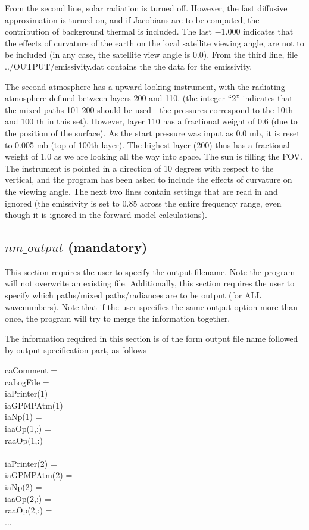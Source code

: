 \documentclass[12pt]{article}
\newcommand{\ttab}{\indent\indent}
\begin{document}
{From the second line, solar radiation is turned off.  However, the
fast diffusive approximation is turned on, and if Jacobians are to
be computed, the contribution of background thermal is included.
The last $-1.000$ indicates that the effects of curvature of the
earth on the local satellite viewing angle, are not to be included
(in any case, the satellite view angle is 0.0).  From the third
line, file {\sf ../OUTPUT/emissivity.dat} contains the the data for
the emissivity.

The second atmosphere has a upward looking instrument, with the
radiating atmosphere defined between layers 200 and 110.  (the
integer ``2'' indicates that the mixed paths 101-200 should be
used---the pressures correspond to the 10th and 100 th in this set).
However, layer 110 has a fractional weight of 0.6 (due to the
position of the surface).  As the start pressure was input as 0.0
mb, it is reset to 0.005 mb (top of 100th layer).  The highest layer
(200) thus has a fractional weight of 1.0 as we are looking all the
way into space.  The sun is filling the FOV.  The instrument is
pointed in a direction of 10 degrees with respect to the vertical,
and the program has been asked to include the effects of curvature
on the viewing angle.  The next two lines contain settings that are
read in and ignored (the emissivity is set to 0.85 across the entire
frequency range, even though it is ignored in the forward model
calculations).

\subsection{$nm\_output$ (mandatory)}

This section requires the user to specify the output filename.  Note
the program will not overwrite an existing file. Additionally, this section 
requires the user to specify which paths/mixed paths/radiances are to
be output (for ALL wavenumbers).  Note that if the user specifies the
same output option more than once, the program will try to merge the
information together.

The information required in this section is of the form
output file name followed by output specification part, as follows

\medskip
{\sf
\ttab caComment = \\
\ttab caLogFile = \\
\ttab iaPrinter(1)          =  \\
\ttab \indent iaGPMPAtm(1)  = \\
\ttab \indent iaNp(1)       = \\
\ttab \indent iaaOp(1,:)    = \\
\ttab \indent raaOp(1,:)    = \\
\ttab \\
\ttab iaPrinter(2)          =  \\
\ttab \indent iaGPMPAtm(2)  = \\
\ttab \indent iaNp(2)       = \\
\ttab \indent iaaOp(2,:)    = \\
\ttab \indent raaOp(2,:)    = \\
\ttab ...\\

}}
\end{document}
